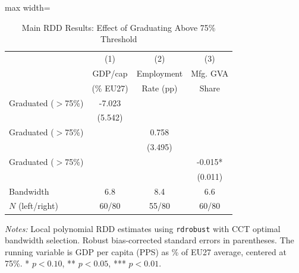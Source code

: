 \begin{table}[htbp]
\centering
\caption{Main RDD Results: Effect of Graduating Above 75\% Threshold}
\label{tab:main_rdd}
\begin{adjustbox}{max width=\textwidth}
\begin{tabular}{lccc}
\hline\hline
 & (1) & (2) & (3) \\
 & GDP/cap & Employment & Mfg. GVA \\
 & (\% EU27) & Rate (pp) & Share \\
\hline
Graduated ($>$75\%) & -7.023 & & \\
 & (5.542) & & \\
Graduated ($>$75\%) & & 0.758 & \\
 & & (3.495) & \\
Graduated ($>$75\%) & & & -0.015* \\
 & & & (0.011) \\
\hline
Bandwidth & 6.8 & 8.4 & 6.6 \\
$N$ (left/right) & 60/80 & 55/80 & 60/80 \\
\hline\hline
\end{tabular}
\end{adjustbox}
\begin{tablenotes}[flushleft]\small
\item \textit{Notes:} Local polynomial RDD estimates using \texttt{rdrobust} with CCT optimal bandwidth selection. Robust bias-corrected standard errors in parentheses. The running variable is GDP per capita (PPS) as \% of EU27 average, centered at 75\%. * $p < 0.10$, ** $p < 0.05$, *** $p < 0.01$.
\end{tablenotes}
\end{table}

